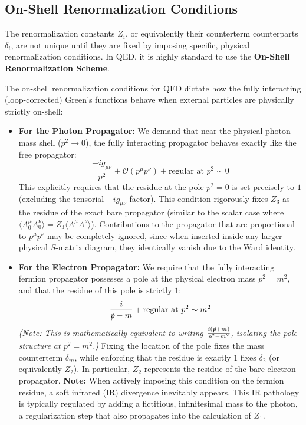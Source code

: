 \subsection{On-Shell Renormalization Conditions}

The renormalization constants $Z_i$, or equivalently their counterterm counterparts $\delta_i$, are not unique until they are fixed by imposing specific, physical renormalization conditions. In QED, it is highly standard to use the \textbf{On-Shell Renormalization Scheme}.

The on-shell renormalization conditions for QED dictate how the fully interacting (loop-corrected) Green's functions behave when external particles are physically strictly on-shell:

\begin{itemize}
    \item \textbf{For the Photon Propagator:}
          We demand that near the physical photon mass shell ($p^2 \to 0$), the fully interacting propagator behaves exactly like the free propagator:
          \[ \frac{-i g_{\mu\nu}}{p^2} + \mathcal{O}(p^\mu p^\nu) + \text{regular at } p^2 \sim 0 \]
          This explicitly requires that the residue at the pole $p^2 = 0$ is set precisely to $1$ (excluding the tensorial $-i g_{\mu\nu}$ factor). This condition rigorously fixes $Z_3$ as the residue of the exact bare propagator (similar to the scalar case where $\langle A^\mu_0 A^\nu_0 \rangle = Z_3 \langle A^\mu A^\nu \rangle$). Contributions to the propagator that are proportional to $p^\mu p^\nu$ may be completely ignored, since when inserted inside any larger physical $S$-matrix diagram, they identically vanish due to the Ward identity.

    \item \textbf{For the Electron Propagator:}
          We require that the fully interacting fermion propagator possesses a pole at the physical electron mass $p^2 = m^2$, and that the residue of this pole is strictly $1$:
          \[ \frac{i}{\slashed{p} - m} + \text{regular at } p^2 \sim m^2 \]
          \textit{(Note: This is mathematically equivalent to writing $\frac{i(\slashed{p} + m)}{p^2 - m^2}$, isolating the pole structure at $p^2=m^2$.)}
          Fixing the location of the pole fixes the mass counterterm $\delta_m$, while enforcing that the residue is exactly $1$ fixes $\delta_2$ (or equivalently $Z_2$). In particular, $Z_2$ represents the residue of the bare electron propagator.
          \textbf{Note:} When actively imposing this condition on the fermion residue, a soft infrared (IR) divergence inevitably appears. This IR pathology is typically regulated by adding a fictitious, infinitesimal mass to the photon, a regularization step that also propagates into the calculation of $Z_1$.


\end{itemize}
